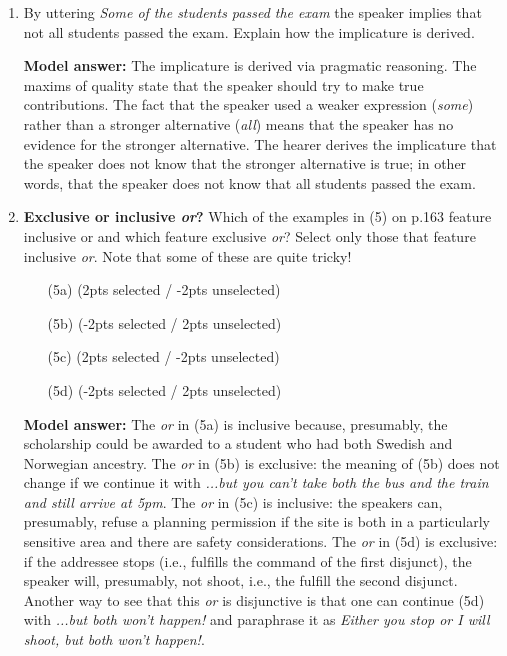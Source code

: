 \documentclass[a4,11pt]{article}
\newcommand{\6}{\mbox{$[\hspace*{-.6mm}[$}}
\newcommand{\9}{\mbox{$]\hspace*{-.6mm}]$}}
\begin{document}
\begin{enumerate}[leftmargin = 12pt]
\item By uttering {\it Some of the students passed the exam} the speaker implies that not all students passed the exam. Explain how the implicature is derived.

{ \bf Model answer:}  The implicature is derived via pragmatic reasoning. The maxims of quality state that the speaker should try to make true contributions. The fact that the speaker used a weaker expression (\textit{some}) rather than a stronger alternative (\textit{all}) means that the speaker has no evidence for the stronger alternative. The hearer derives the implicature that the speaker does not know that the stronger alternative is true; in other words, that the speaker does not know that all students passed the exam.


\item {\bf Exclusive or inclusive {\em or}?} Which of the examples in (5) on p.163 feature inclusive or and which feature exclusive {\em or}? Select only those that feature inclusive {\em or}. Note that some of these are quite tricky! 

\begin{enumerate}[noitemsep]
\item[(5a)] (2pts selected / -2pts unselected)
\item[(5b)] (-2pts selected / 2pts unselected)
\item[(5c)] (2pts selected / -2pts unselected)
\item[(5d)] (-2pts selected / 2pts unselected)
\end{enumerate}

{\bf Model answer:} The {\em or} in (5a) is inclusive because, presumably, the scholarship could be awarded to a student who had both Swedish and Norwegian ancestry. The {\em or} in (5b) is exclusive: the meaning of (5b) does not change if we continue it with {\em ...but you can't take both the bus and the train and still arrive at 5pm}. The {\em or} in (5c) is inclusive: the speakers can, presumably, refuse a planning permission if the site is both in a particularly sensitive area and there are safety considerations. The {\em or} in (5d) is exclusive: if the addressee stops (i.e., fulfills the command of the first disjunct), the speaker will, presumably, not shoot, i.e., the fulfill the second disjunct. Another way to see that this {\em or} is disjunctive is that one can continue (5d) with {\em ...but both won't happen!} and paraphrase it as {\em Either you stop or I will shoot, but both won't happen!}. 
\end{enumerate}
\end{document}
